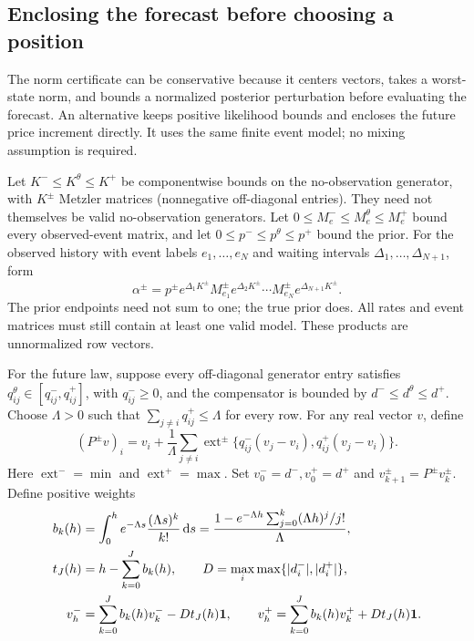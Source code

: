\documentclass[11pt]{article}
\theoremstyle{plain}
\theoremstyle{definition}
\theoremstyle{remark}
\newcommand{\dd}{\,\mathrm d}
\begin{document}
\subsection{Enclosing the forecast before choosing a position}
\label{sec:bookinterval}

The norm certificate can be conservative because it centers
vectors, takes a worst-state norm, and bounds a normalized
posterior perturbation before evaluating the forecast.
An alternative keeps positive likelihood bounds and encloses the
future price increment directly. It uses the same finite event
model; no mixing assumption is required.

Let \(K^-\le K^\theta\le K^+\) be componentwise bounds on the
no-observation generator, with \(K^\pm\) Metzler matrices
(nonnegative off-diagonal entries). They need not themselves be
valid no-observation generators. Let
\(0\le M_e^-\le M_e^\theta\le M_e^+\) bound every observed-event
matrix, and let \(0\le p^-\le p^\theta\le p^+\) bound the prior.
For the observed history with event labels \(e_1,\ldots,e_N\)
and waiting intervals \(\Delta_1,\ldots,\Delta_{N+1}\), form
\[
 \alpha^\pm
 =p^\pm e^{\Delta_1K^\pm}M_{e_1}^\pm
       e^{\Delta_2K^\pm}\cdots
       M_{e_N}^\pm e^{\Delta_{N+1}K^\pm}.
\]
The prior endpoints need not sum to one; the true prior does.
All rates and event matrices must still contain at least one
valid model. These products are unnormalized row vectors.

For the future law, suppose every off-diagonal generator entry
satisfies \(q_{ij}^\theta\in[q_{ij}^-,q_{ij}^+]\), with
\(q_{ij}^-\ge0\), and the compensator is bounded by
\(d^-\le d^\theta\le d^+\). Choose
\(\Lambda>0\) such that
\(\sum_{j\ne i}q_{ij}^+\le\Lambda\) for every row.
For any real vector \(v\), define
\begin{equation}\label{eq:intervaltransition}
 (P^\pm v)_i
 =v_i+\frac1\Lambda\sum_{j\ne i}
   \operatorname{ext}^{\pm}
       \{q_{ij}^-(v_j-v_i),q_{ij}^+(v_j-v_i)\}.
\end{equation}
Here \(\operatorname{ext}^-=\min\) and
\(\operatorname{ext}^+=\max\). Set
\(v_0^-=d^-,v_0^+=d^+\) and
\(v_{k+1}^\pm=P^\pm v_k^\pm\). Define positive weights
\begin{align}
 b_k(h)&=\int_0^h e^{-\Lambda s}
                  \frac{(\Lambda s)^k}{k!}\dd s
 =\frac{1-e^{-\Lambda h}
                    \sum_{j=0}^k(\Lambda h)^j/j!}{\Lambda},
 \label{eq:forecastweights}\\
 t_J(h)&=h-\sum_{k=0}^Jb_k(h),\qquad
 D=\max_i\max\{|d_i^-|,|d_i^+|\},\notag\\
 v_h^-&=\sum_{k=0}^J b_k(h)v_k^- -Dt_J(h)\mathbf1,\qquad
 v_h^+=\sum_{k=0}^J b_k(h)v_k^+ +Dt_J(h)\mathbf1.
 \label{eq:futureenclosure}
\end{align}
\end{document}

